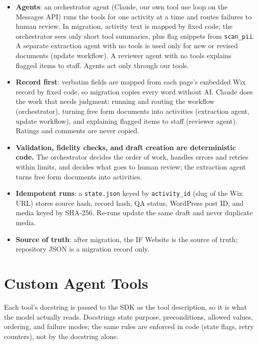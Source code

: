 \begin{itemize}
  \item \textbf{Agents}: an orchestrator agent (Claude, our own tool use loop on the Messages API) runs the tools for one activity at a time and routes failures to human review. In migration, activity text is mapped by fixed code; the orchestrator sees only short tool summaries, plus flag snippets from \texttt{scan\_pii}. A separate extraction agent with no tools is used only for new or revised documents (update workflow). A reviewer agent with no tools explains flagged items to staff. Agents act only through our tools.
  \item \textbf{Record first}: verbatim fields are mapped from each page's embedded Wix record by fixed code, so migration copies every word without AI. Claude does the work that needs judgment: running and routing the workflow (orchestrator), turning free form documents into activities (extraction agent, update workflow), and explaining flagged items to staff (reviewer agent). Ratings and comments are never copied.
  \item \textbf{Validation, fidelity checks, and draft creation are deterministic code.} The orchestrator decides the order of work, handles errors and retries within limits, and decides what goes to human review; the extraction agent turns free form documents into activities.
  \item \textbf{Idempotent runs}: a \texttt{state.json} keyed by \texttt{activity\_id} (slug of the Wix URL) stores source hash, record hash, QA status, WordPress post ID, and media keyed by SHA-256. Re-runs update the same draft and never duplicate media.
  \item \textbf{Source of truth}: after migration, the IF Website is the source of truth; repository JSON is a migration record only.
\end{itemize}

\section{Custom Agent Tools}
Each tool's docstring is passed to the SDK as the tool description, so it is what the model actually reads. Docstrings state purpose, preconditions, allowed values, ordering, and failure modes; the same rules are enforced in code (state flags, retry counters), not by the docstring alone.

